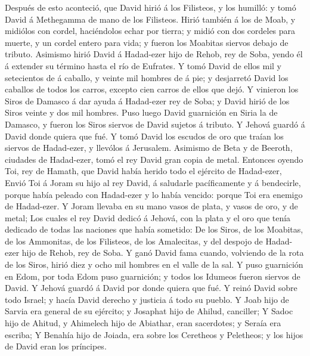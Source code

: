  Después de esto aconteció, que David hirió á los Filisteos,
y los humilló: y tomó David á Methegamma de mano de los Filisteos.
 Hirió también á los de Moab, y midiólos con cordel,
haciéndolos echar por tierra; y midió con dos cordeles para muerte, y un
cordel entero para vida; y fueron los Moabitas siervos debajo de
tributo.  Asimismo hirió David á Hadad-ezer hijo de Rehob,
rey de Soba, yendo él á extender su término hasta el río de Eufrates.
 Y tomó David de ellos mil y setecientos de á caballo, y
veinte mil hombres de á pie; y desjarretó David los caballos de todos
los carros, excepto cien carros de ellos que dejó.  Y
vinieron los Siros de Damasco á dar ayuda á Hadad-ezer rey de Soba; y
David hirió de los Siros veinte y dos mil hombres.  Puso
luego David guarnición en Siria la de Damasco, y fueron los Siros
siervos de David sujetos á tributo. Y Jehová guardó á David donde quiera
que fué.  Y tomó David los escudos de oro que traían los
siervos de Hadad-ezer, y llevólos á Jerusalem.  Asimismo de
Beta y de Beeroth, ciudades de Hadad-ezer, tomó el rey David gran copia
de metal.  Entonces oyendo Toi, rey de Hamath, que David
había herido todo el ejército de Hadad-ezer,  Envió Toi á
Joram su hijo al rey David, á saludarle pacíficamente y á bendecirle,
porque había peleado con Hadad-ezer y lo había vencido: porque Toi era
enemigo de Hadad-ezer. Y Joram llevaba en su mano vasos de plata, y
vasos de oro, y de metal;  Los cuales el rey David dedicó á
Jehová, con la plata y el oro que tenía dedicado de todas las naciones
que había sometido:  De los Siros, de los Moabitas, de los
Ammonitas, de los Filisteos, de los Amalecitas, y del despojo de
Hadad-ezer hijo de Rehob, rey de Soba.  Y ganó David fama
cuando, volviendo de la rota de los Siros, hirió diez y ocho mil hombres
en el valle de la sal.  Y puso guarnición en Edom, por toda
Edom puso guarnición; y todos los Idumeos fueron siervos de David. Y
Jehová guardó á David por donde quiera que fué.  Y reinó
David sobre todo Israel; y hacía David derecho y justicia á todo su
pueblo.  Y Joab hijo de Sarvia era general de su ejército;
y Josaphat hijo de Ahilud, canciller;  Y Sadoc hijo de
Ahitud, y Ahimelech hijo de Abiathar, eran sacerdotes; y Seraía era
escriba;  Y Benahía hijo de Joiada, era sobre los Ceretheos
y Peletheos; y los hijos de David eran los príncipes.

